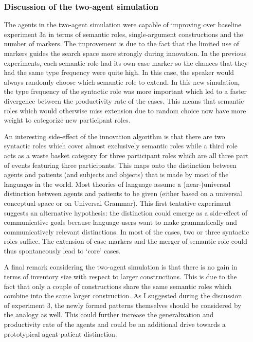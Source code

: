 \subsubsection{Discussion of the two-agent simulation}
 The agents in the two-agent simulation were capable of improving over baseline experiment 3a in terms of semantic roles, single-argument constructions and the number of markers. The improvement is due to the fact that the limited use of markers guides the search space more strongly during innovation. In the previous experiments, each semantic role had its own case marker so the chances that they had the same type frequency were quite high. In this case, the speaker would always randomly choose which semantic role to extend. In this new simulation, the type frequency of the syntactic role was more important which led to a faster divergence between the productivity rate of the cases. This means that semantic roles which would otherwise miss extension due to random choice now have more weight to categorize new participant roles.

An interesting side-effect of the innovation algorithm is that there are two syntactic roles which cover almost exclusively semantic roles while a third role acts as a waste basket category for three participant roles which are all three part of events featuring three participants. This maps onto the distinction between agents and patients (and subjects and objects) that is made by most of the languages in the world. Most theories of language assume a (near-)universal distinction between agents and patients to be given (either based on a universal conceptual space or on Universal Grammar). This first tentative experiment suggests an alternative hypothesis: the distinction could emerge as a side-effect of communicative goals because language users want to make grammatically and communicatively relevant distinctions. In most of the cases, two or three syntactic roles suffice. The extension of case markers and the merger of semantic role could thus spontaneously lead to `core' cases.

\newpage 
A final remark considering the two-agent simulation is that there is no gain in terms of inventory size with respect to larger constructions. This is due to the fact that only a couple of constructions share the same semantic roles which combine into the same larger construction. As I suggested during the discussion of experiment 3, the newly formed patterns themselves should be considered by the analogy as well. This could further increase the generalization and productivity rate of the agents and could be an additional drive towards a prototypical agent-patient distinction.
\\
\\
